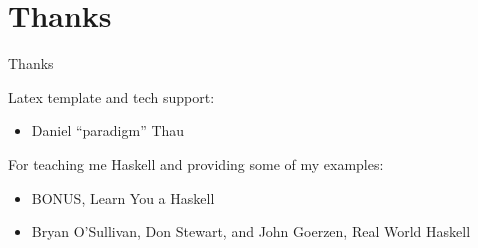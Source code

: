 \documentclass{beamer}                  %
\newcommand{\srule}{
	\rule{\textwidth}{1pt}\\
}
\newlength{\subsecwidth}
\newenvironment{slide}{
	\begin{frame} %
	\settowidth{\subsecwidth}{\insertsubsection} %
	\ifthenelse{\dimtest{\subsecwidth}{<}{1pt}}{ %
		\frametitle{\insertsection\\             %
		\vspace{-1ex}                            %
		\color{fore}\srule                       %
		\par                                     %
		\vspace{-3ex}                            %
		}
	}{                                           %
		\frametitle{\insertsection\ -- \insertsubsection\\ %
		\vspace{-1ex}                            %
		\color{fore}\srule                       %
		\par                                     %
		\vspace{-3ex}                            %
		}
	}
	\Large                                       %
}{
	\end{frame}
}
\newcommand{\titleslide}[1]{
	\section{#1}             %
	\begin{slide}
		\begin{center}
			\color{comments}
			\Huge            %
			#1               %
		\end{center}
	\end{slide}
}
\begin{document}
\titleslide{Thanks}
\begin{slide}
  Latex template and tech support:
  \begin{itemize}
    \item Daniel ``paradigm'' Thau
  \end{itemize}
  For teaching me Haskell and providing some of my examples:
  \begin{itemize}
    \item BONUS, Learn You a Haskell
    \item Bryan O'Sullivan, Don Stewart, and John Goerzen, Real World Haskell
  \end{itemize}
\end{slide}
\end{document}
